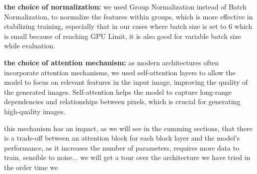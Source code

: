 \documentclass[twocolumn,superscriptaddress,aps]{revtex4-1}
\begin{document}
\textbf{the choice of normalization:} we used Group Normalization instead of Batch Normalization, to normalize the features within groups, which is more effective in stabilizing training, especially that in our cases where batch size is set to 6 which is small because of reaching GPU Limit, it is also good for variable batch size while evaluation.

\textbf{the choice of attention mechanism:} as modern architectures often incorporate attention mechanisms, we used self-attention layers to allow the model to focus on relevant features in the input image, improving the quality of the generated images. Self-attention helps the model to capture long-range dependencies and relationships between pixels, which is crucial for generating high-quality images.

this mechanism has an impact, as we will see in the cumming sections, that there is a trade-off between an attention block for each block layer and the model's performance, as it increases the number of parameters, requires more data to train, sensible to noise...
we will get a tour over the architecture we have tried in the order time we






\end{document}
